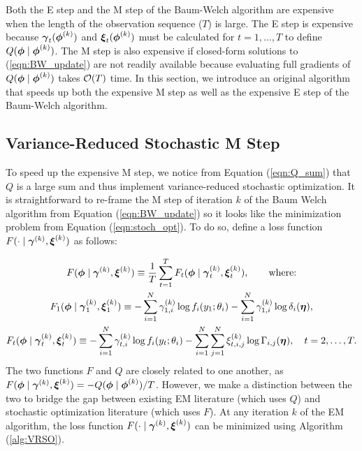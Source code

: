 
Both the E step and the M step of the Baum-Welch algorithm are expensive when the length of the observation sequence ($T$) is large. The E step is expensive because $\boldsymbol{\gamma}_t(\boldsymbol{\phi}^{(k)})$ and $\boldsymbol{\xi}_t(\boldsymbol{\phi}^{(k)})$ must be calculated for $t = 1,\ldots,T$ to define $Q(\boldsymbol{\phi} \mid \boldsymbol{\phi}^{(k)})$. The M step is also expensive if closed-form solutions to (\ref{eqn:BW_update}) are not readily available because evaluating full gradients of $Q(\boldsymbol{\phi} \mid \boldsymbol{\phi}^{(k)})$ takes $\mathcal{O}(T)$ time. In this section, we introduce an original algorithm that speeds up both the expensive M step as well as the expensive E step of the Baum-Welch algorithm. %

\subsection{Variance-Reduced Stochastic M Step}
\label{subsec:stoch_M}

To speed up the expensive M step, we notice from Equation (\ref{eqn:Q_sum}) that $Q$ is a large sum and thus implement variance-reduced stochastic optimization. It is straightforward to re-frame the M step of iteration $k$ of the Baum Welch algorithm from Equation (\ref{eqn:BW_update}) so it looks like the minimization problem from Equation (\ref{eqn:stoch_opt}). To do so, define a loss function $F(\cdot \mid \boldsymbol{\gamma}^{(k)},\boldsymbol{\xi}^{(k)})$ as follows:

\begin{gather}
    F(\boldsymbol{\phi} \mid \boldsymbol{\gamma}^{(k)}, \boldsymbol{\xi}^{(k)}) \equiv \frac{1}{T}\sum_{t=1}^T F_t(\boldsymbol{\phi} \mid \boldsymbol{\gamma}_t^{(k)} , \boldsymbol{\xi}_t^{(k)}), \qquad \text{where:} \\
    F_1(\boldsymbol{\phi} \mid \boldsymbol{\gamma}_1^{(k)},\boldsymbol{\xi}_1^{(k)}) \equiv - \sum_{i=1}^N \gamma_{1,i}^{(k)} \log f_{i}(y_1;\theta_{i}) - \sum_{i=1}^N \gamma_{1,i}^{(k)} \log \delta_{i}(\boldsymbol{\eta}), \\
    F_t(\boldsymbol{\phi} \mid \boldsymbol{\gamma}_t^{(k)} , \boldsymbol{\xi}_t^{(k)}) \equiv - \sum_{i=1}^N \gamma_{t,i}^{(k)} \log f_{i}(y_t;\theta_{i}) - \sum_{i=1}^N \sum_{j=1}^N \xi_{t,i,j}^{(k)} \log \Gamma_{i,j}(\boldsymbol{\eta}), \quad t = 2, \ldots, T.
\end{gather}
%
%
The two functions $F$ and $Q$ are closely related to one another, as $F(\boldsymbol{\phi} \mid \boldsymbol{\gamma}^{(k)}, \boldsymbol{\xi}^{(k)}) = - Q(\boldsymbol{\phi} \mid \boldsymbol{\phi}^{(k)}) / T$. However, we make a distinction between the two to bridge the gap between existing EM literature (which uses $Q$) and stochastic optimization literature (which uses $F$). At any iteration $k$ of the EM algorithm, the loss function $F(\cdot \mid \boldsymbol{\gamma}^{(k)},\boldsymbol{\xi}^{(k)})$ can be minimized using Algorithm (\ref{alg:VRSO}). 

